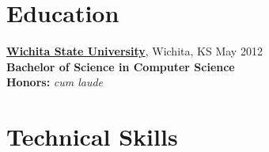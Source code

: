 \documentclass[10pt]{article}       %
\begin{document}
\vspace{-16.5pt}


\section*{Education}
\textbf{\href{https://www.wichita.edu}{Wichita State University}}, Wichita, KS \hfill May 2012 \\
\vspace{1pt}
\textbf{Bachelor of Science in Computer Science} \\
\vspace{1pt}
\textbf{Honors:} \textit{cum laude} \\



\vspace{-10pt}

\section*{Technical Skills}
\newlength{\mylength}
\setlength{\mylength}{9.25em}
\end{document}
